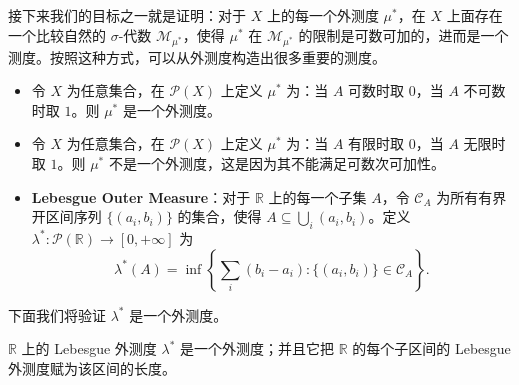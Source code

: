 \documentclass[11pt]{article}
\newcommand{\RR}{\mathbb{R}}
\newcommand{\calC}{\mathcal{C}}
\newcommand{\calM}{\mathcal{M}}
\newcommand{\calP}{\mathcal{P}}
\begin{document}
接下来我们的目标之一就是证明：对于 $X$ 上的每一个外测度 $\mu^*$，在 $X$ 上面存在一个比较自然的 $\sigma$-代数 $\calM_{\mu^*}$，使得 $\mu^*$ 在 $\calM_{\mu^*}$ 的限制是可数可加的，进而是一个测度。按照这种方式，可以从外测度构造出很多重要的测度。

\begin{example}
    \begin{itemize}
        \item 令 $X$ 为任意集合，在 $\calP(X)$ 上定义 $\mu^*$ 为：当 $A$ 可数时取 $0$，当 $A$ 不可数时取 $1$。则 $\mu^*$ 是一个外测度。
        \item 令 $X$ 为任意集合，在 $\calP(X)$ 上定义 $\mu^*$ 为：当 $A$ 有限时取 $0$，当 $A$ 无限时取 $1$。则 $\mu^*$ 不是一个外测度，这是因为其不能满足可数次可加性。
        \item {\normalfont\bfseries Lebesgue Outer Measure}：对于 $\RR$ 上的每一个子集 $A$，令 $\calC_A$ 为所有有界开区间序列 $\{(a_i,b_i)\}$ 的集合，使得 $A \subseteq \bigcup_i (a_i,b_i)$。定义 $\lambda^*:\calP(\RR)\to[0,+\infty]$ 为
              \[
                  \lambda^*(A) = \inf\left\{\sum_i (b_i-a_i) : \{(a_i,b_i)\}\in \calC_A \right\}.
              \]
    \end{itemize}
\end{example}

下面我们将验证 $\lambda^*$ 是一个外测度。

\begin{proposition}
    $\RR$ 上的 Lebesgue 外测度 $\lambda^*$ 是一个外测度；并且它把 $\RR$ 的每个子区间的 Lebesgue 外测度赋为该区间的长度。
\end{proposition}
\end{document}
